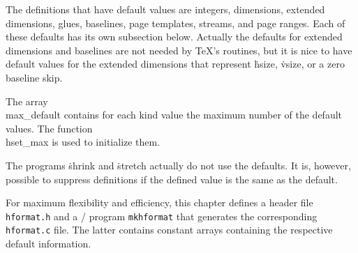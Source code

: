 The definitions that have default values are integers, dimensions,
extended dimensions, glues, baselines, page templates, streams, and page ranges.
Each of these defaults has its own subsection below.
Actually the defaults for extended dimensions and baselines are not needed by \TeX's
routines, but it is nice to have default values for the extended dimensions that represent
\.{hsize}, \.{vsize}, or a zero baseline skip.

The array \\{max\_default} contains for each kind value the maximum number of
the default values. The function \\{hset\_max} is used to initialize them.

The programs \.{shrink} and \.{stretch} actually do not use the defaults.
It is, however, possible to suppress definitions if the defined value
is the same as the default.

For maximum flexibility and efficiency, this chapter defines a
header file {\tt hformat.h} and a \CEE/ program {\tt mkhformat}
that generates the corresponding {\tt hformat.c} file.
The latter contains constant arrays containing the respective default information.

